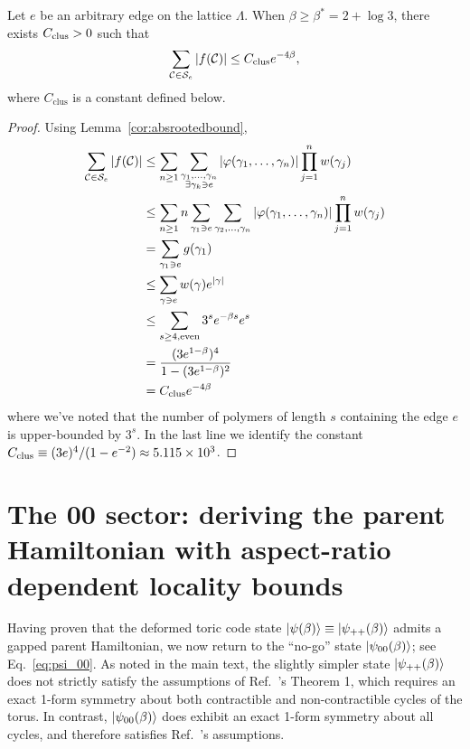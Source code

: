 \begin{lemma}\label{lem:Cbound}
    Let $e$ be an arbitrary edge on the lattice $\Lambda$. When $\beta \geq \beta^\ast = 2 + \log 3$, there exists $C_{\mathrm{clus}} >0 $ such that 
    \begin{equation}
        \sum_{\mathcal{C} \in \mathcal{S}_e} \abs{f(\mathcal{C})} \leq C_{\mathrm{clus}} e^{-4\beta} ,
    \end{equation}
    where $C_{\text{clus}}$ is a constant defined below.
\end{lemma}
\begin{proof} 
Using Lemma~\ref{cor:absrootedbound}, 
\begin{subequations}
\begin{align}
    \sum_{\mathcal{C} \in \mathcal{S}_e} \abs{f(\mathcal{C})} &\leq \sum_{n\geq 1} \sum_{\substack{\gamma_1,\dots,\gamma_n\\ \exists \gamma_k \ni e}} \abs{\varphi(\gamma_1,\dots,\gamma_n)} \prod_{j = 1}^n w(\gamma_j) \\
    &\leq  \sum_{n\geq 1} n \sum_{\gamma_1 \ni e}\sum_{\gamma_2,\dots,\gamma_n} \abs{\varphi(\gamma_1,\dots,\gamma_n)} \prod_{j = 1}^n w(\gamma_j) \\
    &= \sum_{\gamma_1 \ni e} g(\gamma_1)\\
    &\leq  \sum_{\gamma \ni e} w(\gamma) e^{|\gamma|} \\
    &\leq \sum_{s \geq 4, \mathrm{even}} 3^s e^{-\beta s} e^s \\
    &= \frac{(3e^{1-\beta})^4}{1 - (3e^{1-\beta})^2} \\
    &= C_{\mathrm{clus}} e^{-4\beta}
\end{align}
\end{subequations}
where we've noted that the number of polymers of length $s$ containing the edge $e$ is upper-bounded by $3^s$. In the last line we identify the constant $C_{\mathrm{clus}} \equiv { (3e)^4 } / (1-e^{-2}) \approx 5.115 \times 10^3$.
\end{proof}






\section{The 00 sector: deriving the parent Hamiltonian with aspect-ratio dependent locality bounds}
\label{sec:no_go}
Having proven that the deformed toric code state $\ket{\psi(\beta)} \equiv \ket{\psi_{++}(\beta)}$ admits a gapped parent Hamiltonian, we now return to the ``no-go'' state $\ket{\psi_{00}(\beta)}$; see Eq.~\eqref{eq:psi_00}. As noted in the main text, the slightly simpler state $\ket{\psi_{++}(\beta)}$ does not strictly satisfy the assumptions of Ref.~'s Theorem 1, which requires an exact 1-form symmetry about both contractible and non-contractible cycles of the torus. In contrast, $\ket{\psi_{00}(\beta)}$ does exhibit an exact 1-form symmetry about all cycles, and therefore satisfies Ref.~'s assumptions.



